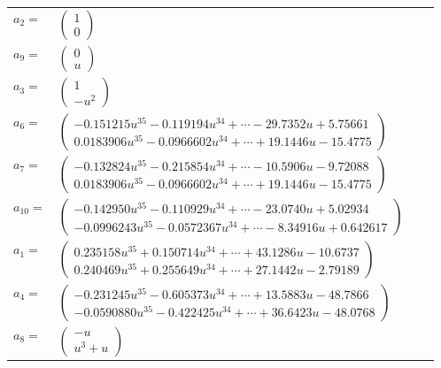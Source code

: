 \documentclass[1p]{elsarticle_modified}
\theoremstyle{definition}
\begin{document}
\begin{tabular}{m{7pt} m{180pt} m{7pt} m{180pt} }
\flushright $a_{2}=$&$\begin{pmatrix}1\\0\end{pmatrix}$ \\
\flushright $a_{9}=$&$\begin{pmatrix}0\\u\end{pmatrix}$ \\
\flushright $a_{3}=$&$\begin{pmatrix}1\\- u^2\end{pmatrix}$ \\
\flushright $a_{6}=$&$\begin{pmatrix}-0.151215 u^{35}-0.119194 u^{34}+\cdots-29.7352 u+5.75661\\0.0183906 u^{35}-0.0966602 u^{34}+\cdots+19.1446 u-15.4775\end{pmatrix}$ \\
\flushright $a_{7}=$&$\begin{pmatrix}-0.132824 u^{35}-0.215854 u^{34}+\cdots-10.5906 u-9.72088\\0.0183906 u^{35}-0.0966602 u^{34}+\cdots+19.1446 u-15.4775\end{pmatrix}$ \\
\flushright $a_{10}=$&$\begin{pmatrix}-0.142950 u^{35}-0.110929 u^{34}+\cdots-23.0740 u+5.02934\\-0.0996243 u^{35}-0.0572367 u^{34}+\cdots-8.34916 u+0.642617\end{pmatrix}$ \\
\flushright $a_{1}=$&$\begin{pmatrix}0.235158 u^{35}+0.150714 u^{34}+\cdots+43.1286 u-10.6737\\0.240469 u^{35}+0.255649 u^{34}+\cdots+27.1442 u-2.79189\end{pmatrix}$ \\
\flushright $a_{4}=$&$\begin{pmatrix}-0.231245 u^{35}-0.605373 u^{34}+\cdots+13.5883 u-48.7866\\-0.0590880 u^{35}-0.422425 u^{34}+\cdots+36.6423 u-48.0768\end{pmatrix}$ \\
\flushright $a_{8}=$&$\begin{pmatrix}- u\\u^3+u\end{pmatrix}$ \\

\end{tabular}
\end{document}
